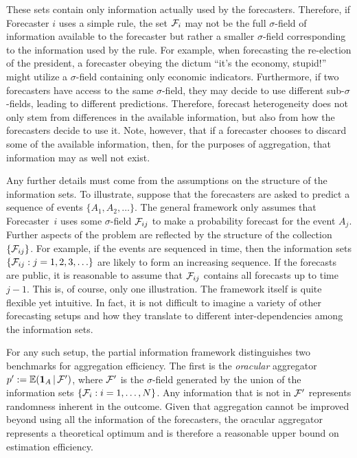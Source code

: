 \documentclass[12pt]{article}
\newcommand{\E}{\mathbb{E}}
\theoremstyle{definition}
\theoremstyle{definition}
\def\one{{\bf 1}}
\def\F{{\cal F}}
\def\E{{\mathbb E}}
\def\|{\, | \,}
\begin{document}
These sets contain only information actually used by the
forecasters. Therefore, if Forecaster $i$ uses a simple rule, the set $\F_i$ may not be the full $\sigma$-field of
information available to the forecaster but rather a smaller
$\sigma$-field corresponding to the information used by the
rule.  For example, when forecasting the re-election of the president,  a forecaster obeying the dictum ``it's the economy,
stupid!''  might utilize a $\sigma$-field containing only economic
indicators.  Furthermore, if two forecasters have access to the same $\sigma$-field, they may decide to use different sub-$\sigma$-fields, leading to different predictions. 
Therefore,
forecast heterogeneity does not only stem from differences in the available information, but also from how the forecasters decide to use it.  Note, however, that if a forecaster chooses to discard
some of the available information, then, for the purposes of aggregation,
that information may as well not exist. 

Any further details must come from the
assumptions on the structure of the information sets. To illustrate, suppose that the forecasters are asked to predict a sequence of events
$\{ A_1, A_2 , \ldots \}$. The general framework only assumes that
Forecaster~$i$ uses some $\sigma$-field $\F_{ij}$ to make a
probability forecast for the event $A_j$.  Further aspects of the problem
are reflected by the structure of the collection $\{ \F_{ij} \}$.  For
example, if the events are sequenced in time, then the information
sets $\{ \F_{ij} : j = 1 , 2, 3, \ldots \}$ are likely to form an
increasing sequence.  If the forecasts are public, it is reasonable 
to assume that $\F_{ij}$ contains all forecasts up to time $j-1$.
This is, of course, only one illustration. The framework itself is quite flexible
yet intuitive. In fact, it is not difficult to imagine a variety
of other forecasting setups and how they translate to
different inter-dependencies among the information sets.

For any such setup, the partial information framework distinguishes two benchmarks for aggregation efficiency.  The first is the {\em oracular} aggregator
$p' := \E (\one_A \| \F')$, where $\F'$ is the $\sigma$-field
generated by the union of the information sets $\{\F_i : i = 1, \dots, N\}$. Any
information that is not in $\F'$ represents randomness inherent in the
outcome. Given that aggregation cannot be improved beyond using all the information  of the forecasters, the oracular aggregator represents a theoretical optimum and is therefore a reasonable upper bound on estimation efficiency. 
\end{document}
